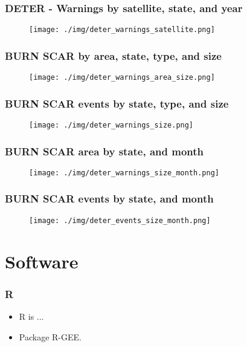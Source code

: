 \documentclass{beamer}
\begin{document}
\begin{frame}
    \frametitle{DETER - Warnings by satellite, state, and year}
    \begin{figure}
        \centering
        \texttt{[image: ./img/deter\_warnings\_satellite.png]}
    \end{figure}
\end{frame}



\begin{frame}
    \frametitle{BURN SCAR by area, state, type, and size}
    \begin{figure}
        \centering
        \texttt{[image: ./img/deter\_warnings\_area\_size.png]}
    \end{figure}
\end{frame}

\begin{frame}
    \frametitle{BURN SCAR events by state, type, and size}
    \begin{figure}
        \centering
        \texttt{[image: ./img/deter\_warnings\_size.png]}
    \end{figure}
\end{frame}

\begin{frame}
    \frametitle{BURN SCAR area by state, and month}
    \begin{figure}
        \centering
        \texttt{[image: ./img/deter\_warnings\_size\_month.png]}
    \end{figure}
\end{frame}

\begin{frame}
    \frametitle{BURN SCAR events by state, and month}
    \begin{figure}
        \centering
        \texttt{[image: ./img/deter\_events\_size\_month.png]}
    \end{figure}
\end{frame}
  



\section{Software}

\begin{frame}
    \frametitle{R}
    \begin{itemize}
        \item R is ...
        \item Package R-GEE.
    \end{itemize}
\end{frame}
\end{document}
